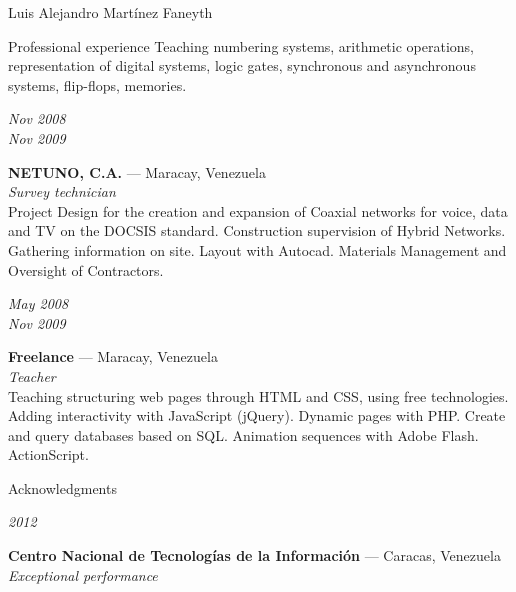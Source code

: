 \documentclass[11pt,letterpaper]{article}
\begin{document}
\begin{cv}{Luis Alejandro Mart\'inez Faneyth}
\begin{cvlist}{Professional experience}
{{		\footnotesize{Teaching numbering systems, arithmetic operations, representation of digital systems, logic gates, synchronous and asynchronous systems, flip-flops, memories.}
	}
}
\item[{\parbox[t]{6em}{\textit{\large{Nov 2008\\Nov 2009}}}}]{
	\parbox[t]{\linewidth}{
		\textbf{NETUNO, C.A.} --- Maracay, Venezuela\\
		\textit{Survey technician}\\
		\footnotesize{Project Design for the creation and expansion of Coaxial networks for voice, data and TV on the DOCSIS standard. Construction supervision of Hybrid Networks. Gathering information on site. Layout with Autocad. Materials Management and Oversight of Contractors.}
	}
}
\item[{\parbox[t]{6em}{\textit{\large{May 2008\\Nov 2009}}}}]{
	\parbox[t]{\linewidth}{
		\textbf{Freelance} --- Maracay, Venezuela\\
		\textit{Teacher}\\
		\footnotesize{Teaching structuring web pages through HTML and CSS, using free technologies. Adding interactivity with JavaScript (jQuery). Dynamic pages with PHP. Create and query databases based on SQL. Animation sequences with Adobe Flash. ActionScript.}
	}
}
\end{cvlist}

\begin{cvlist}{Acknowledgments}
\item[{\parbox[t]{6em}{\textit{\large{2012}}}}]{
	\parbox[t]{\linewidth}{
		\textbf{Centro Nacional de Tecnolog\'ias de la Informaci\'on} --- Caracas, Venezuela\\
		\textit{Exceptional performance}
	}
}
\end{cvlist}


\end{cv}
\end{document}
